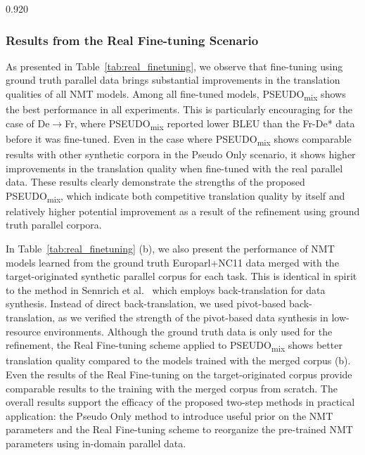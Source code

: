 \documentclass[11pt,letterpaper]{article}
\newcommand{\mylinespacing}{0.920}
\begin{document}
\begin{spacing}{\mylinespacing}
\subsubsection{Results from the Real Fine-tuning Scenario}
As presented in Table~\ref{tab:real_finetuning}, we observe that fine-tuning using ground truth parallel data brings substantial improvements in the translation qualities of all NMT models. Among all fine-tuned models, PSEUDO\textsubscript{mix} shows the best performance in all experiments. This is particularly encouraging for the case of De\(\rightarrow\)Fr, where PSEUDO\textsubscript{mix} reported lower BLEU than the Fr-De* data before it was fine-tuned. Even in the case where PSEUDO\textsubscript{mix} shows comparable results with other synthetic corpora in the Pseudo Only scenario, it shows higher improvements in the translation quality when fine-tuned with the real parallel data. These results clearly demonstrate the strengths of the proposed PSEUDO\textsubscript{mix}, which indicate both competitive translation quality by itself and relatively higher potential improvement as a result of the refinement using ground truth parallel corpora.

In Table~\ref{tab:real_finetuning} (b), we also present the performance of NMT models learned from the ground truth Europarl+NC11 data merged with the target-originated synthetic parallel corpus for each task. This is identical in spirit to the method in Sennrich et al.~ which employs back-translation for data synthesis. Instead of direct back-translation, we used pivot-based back-translation, as we verified the strength of the pivot-based data synthesis in low-resource environments. Although the ground truth data is only used for the refinement, the Real Fine-tuning scheme applied to PSEUDO\textsubscript{mix} shows better translation quality compared to the models trained with the merged corpus (b). Even the results of the Real Fine-tuning on the target-originated corpus provide comparable results to the training with the merged corpus from scratch. The overall results support the efficacy of the proposed two-step methods in practical application: the Pseudo Only method to introduce useful prior on the NMT parameters and the Real Fine-tuning scheme to reorganize the pre-trained NMT parameters using in-domain parallel data.



\end{spacing}
\end{document}
